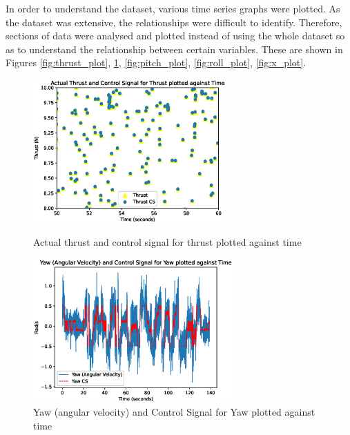 In order to understand the dataset, various time series graphs were plotted. As the dataset was extensive, the relationships were difficult to identify. Therefore, sections of data were analysed and plotted instead of using the whole dataset so as to understand the relationship between certain variables. These are shown in Figures \ref{fig:thrust_plot}, \ref{fig:yaw_plot}, \ref{fig:pitch_plot}, \ref{fig:roll_plot}, \ref{fig:x_plot}.
\begin{figure}[H]
    \centering
    \begin{minipage}[b]{0.45\textwidth}
        \centering
        \includegraphics[height=5.5cm,keepaspectratio]{img/thrust_plot.eps}
        \caption{Actual thrust and control signal for thrust plotted against time}
        \label{fig:thrust_plot}
    \end{minipage}
    \hfill
    \begin{minipage}[b]{0.45\textwidth}
        \centering
        \includegraphics[height=5.5cm,keepaspectratio]{img/yaw_plot.eps}
        \caption{Yaw (angular velocity) and Control Signal for Yaw plotted against time}
        \label{fig:yaw_plot}
    \end{minipage}
\end{figure}

